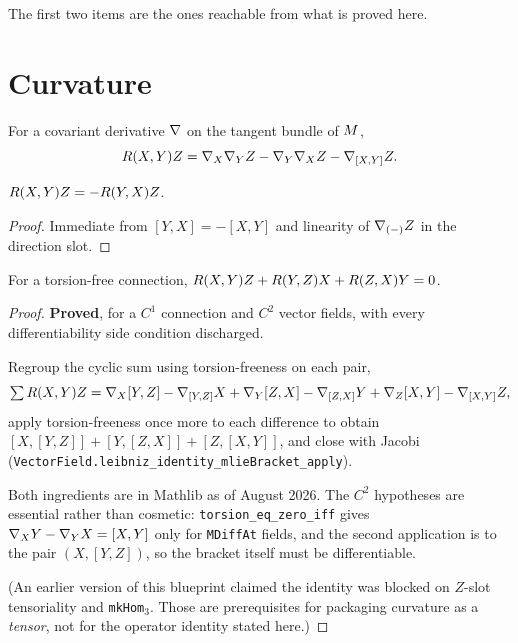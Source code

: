 The first two items are the ones reachable from what is proved here.

\chapter{Curvature}
\label{chap:curvature}

\begin{definition}
  \label{def:curvature}
  \leanok
  For a covariant derivative $\nabla$ on the tangent bundle of $M$,
  \[ R(X,Y)Z = \nabla_X \nabla_Y Z - \nabla_Y \nabla_X Z - \nabla_{[X,Y]} Z. \]
\end{definition}

\begin{lemma}[Antisymmetry]
  \label{lem:curvature-antisymm}
  \leanok
  $R(X,Y)Z = -R(Y,X)Z$.
\end{lemma}

\begin{proof}
  \leanok
  Immediate from $[Y,X] = -[X,Y]$ and linearity of $\nabla_{(-)} Z$ in the
  direction slot.
\end{proof}

\begin{lemma}
  \label{lem:bianchi-first}
  \leanok
  For a torsion-free connection,
  $R(X,Y)Z + R(Y,Z)X + R(Z,X)Y = 0$.
\end{lemma}

\begin{proof}
  \leanok
  \textbf{Proved}, for a $C^1$ connection and $C^2$ vector fields, with every
  differentiability side condition discharged.

  Regroup the cyclic sum
  using torsion-freeness on each pair,
  \[ \textstyle\sum R(X,Y)Z = \nabla_X [Y,Z] - \nabla_{[Y,Z]} X
     + \nabla_Y [Z,X] - \nabla_{[Z,X]} Y + \nabla_Z [X,Y] - \nabla_{[X,Y]} Z, \]
  apply torsion-freeness once more to each difference to obtain
  $[X,[Y,Z]] + [Y,[Z,X]] + [Z,[X,Y]]$, and close with Jacobi
  (\texttt{VectorField.leibniz\_identity\_mlieBracket\_apply}).

  Both ingredients are in Mathlib as of August 2026. The $C^2$ hypotheses are
  essential rather than cosmetic: \texttt{torsion\_eq\_zero\_iff} gives
  $\nabla_X Y - \nabla_Y X = [X,Y]$ only for \texttt{MDiffAt} fields, and the
  second application is to the pair $(X, [Y,Z])$, so the bracket itself must be
  differentiable.

  (An earlier version of this blueprint claimed the identity was blocked on
  $Z$-slot tensoriality and \texttt{mkHom}$_3$. Those are prerequisites for
  packaging curvature as a \emph{tensor}, not for the operator identity stated
  here.)
\end{proof}

